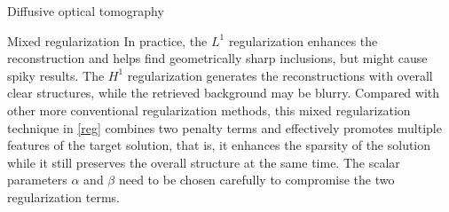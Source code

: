 \documentclass[11pt]{article}%
\renewcommand{\_}{{\fontfamily{ptm}\selectfont\textunderscore}}
\theoremstyle{plain}
\numberwithin{equation}{section}
\begin{document}
\begin{section}{Diffusive optical tomography}
\begin{subsection}{Mixed regularization}
In practice, the $L^1$ regularization enhances the reconstruction and helps find geometrically sharp inclusions, but might cause spiky results. 
The $H^1$ regularization generates the reconstructions with overall clear structures, while the retrieved background may be blurry. 
Compared with other more conventional regularization methods, this mixed regularization technique in \eqref{reg} combines two penalty terms and effectively promotes multiple features of the target solution, that is, it enhances the sparsity of the solution while it still preserves the overall structure at the same time. 
The scalar parameters $\alpha$ and $\beta$ need to be chosen carefully to compromise the two regularization terms.
\end{subsection}


\end{section}
\end{document}
